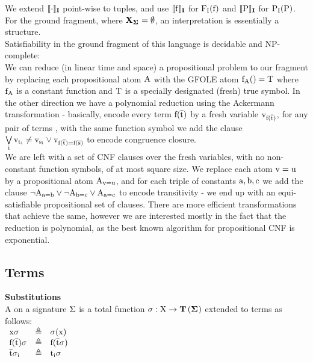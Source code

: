 \noindent
We extend  $\llbracket \mathrm{\cdot} \rrbracket_{\mathbf{I}}$ point-wise to tuples, and use $\llbracket \mathrm{f} \rrbracket_{\mathbf{I}}$ for $\mathrm{\mathrm{F_I}(f)}$ and $\llbracket \mathrm{P} \rrbracket_{\mathbf{I}}$ for $\mathrm{\mathrm{P_I}(P)}$.\\
For the ground fragment, where $\Vs{\sig}=\emptyset$, an interpretation is essentially a structure.\\
Satisfiability in the ground fragment of this language is decidable and NP-complete:\\
We can reduce (in linear time and space) a propositional problem to our fragment by replacing each propositional atom $\mathrm{A}$ with the GFOLE atom $\mathrm{f_A()=T}$ where $\mathrm{f_A}$ is a constant function and $\mathrm{T}$ is a specially designated (fresh) true symbol.
In the other direction we have a polynomial reduction using the Ackermann transformation - basically, encode every term $\mathrm{f}(\mathrm{\overline{t}})$ by a fresh variable  $\mathrm{v_{\mathrm{f}(\mathrm{\overline{t}})}}$, for any pair of terms ,  with the same function symbol we add the clause
$ \bigvee\limits_{\mathrm{i}} \mathrm{\mathrm{v}_{t_i} \neq \mathrm{v}_{s_i}} \lor \mathrm{v}_{\mathrm{f}(\mathrm{\overline{t}})=\mathrm{f}(\mathrm{\overline{s}})}$ to encode congruence closure.\\
We are left with a set of CNF clauses over the fresh variables, with no non-constant function symbols, of at most square size.
We replace each atom $\mathrm{v=u}$ by a propositional atom $\mathrm{A_{v=u}}$, and for each triple of constants $\mathrm{a,b,c}$ we add the clause 
$\mathrm{\lnot A_{a=b} \lor \lnot A_{b=c} \lor A_{a=c}}$ to encode transitivity - we end up with an equi-satisfiable propositional set of clauses.
There are more efficient transformations that achieve the same, however we are interested mostly in the fact that the reduction is polynomial, as the best known algorithm for propositional CNF is exponential.


\subsection*{Terms}
\bigskip

\noindent
\textbf{Substitutions}\\
A  on a signature $\mathrm{\Sigma}$ is a total function $\m{\sigma : \m{X} \rightarrow \Ts{\sig}}$ extended to terms as follows:\\
$
\begin{array}{lll}
\mathrm{x\sigma}         & \triangleq & \mathrm{\sigma(x)}\\
\mathrm{\mathrm{f}(\mathrm{\overline{t}})\sigma} & \triangleq & \mathrm{f(\mathrm{\overline{t}}\sigma)}\\
\mathrm{\mathrm{\overline{t}}\sigma_i} & \triangleq & \mathrm{t_i\sigma}\\
\end{array}
$


